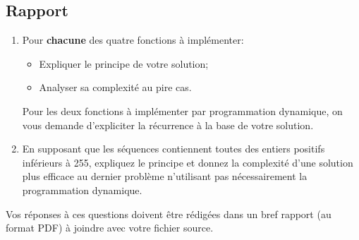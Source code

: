 \documentclass[a4paper,10pt]{article}
\begin{document}
\subsection*{Rapport}

\begin{enumerate}
\item Pour \textbf{chacune} des quatre fonctions à implémenter:
\begin{itemize}
\item Expliquer le principe de votre solution;
\item Analyser sa complexité au pire cas.
\end{itemize}

Pour les deux fonctions à implémenter par programmation
dynamique, on vous demande d'expliciter la récurrence à la
base de votre solution.

\item En supposant que les séquences contiennent toutes des entiers
  positifs inférieurs à 255, expliquez le principe et donnez la
  complexité d'une solution plus efficace au dernier problème
  n'utilisant pas nécessairement la programmation dynamique.
\end{enumerate}

Vos réponses à ces questions doivent être rédigées dans un bref rapport (au format
PDF) à joindre avec votre fichier source.
\end{document}
